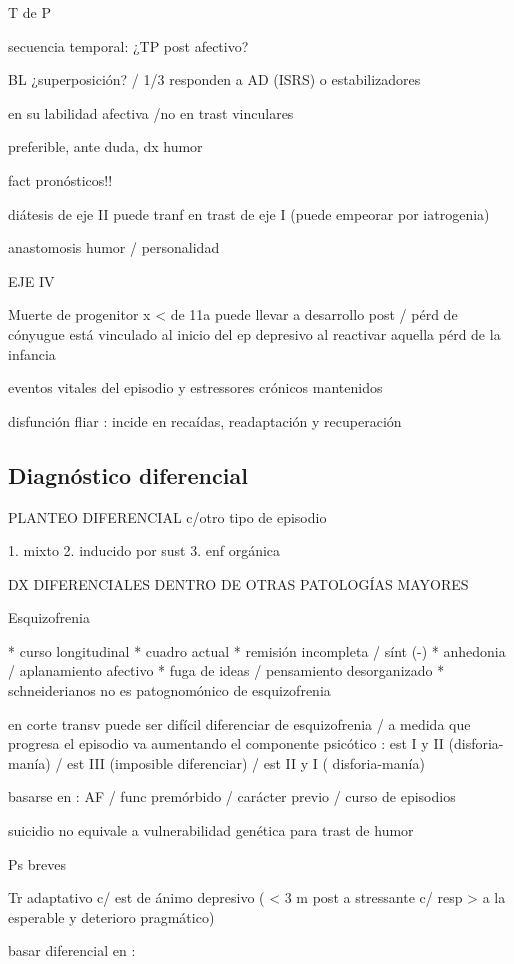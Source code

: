 \documentclass{scrbook}
\begin{document}
T de P

secuencia temporal: ¿TP post afectivo?

BL ¿superposición? / 1/3 responden a AD (ISRS) o estabilizadores

en su labilidad afectiva /no en trast vinculares

preferible, ante duda, dx humor

fact pronósticos!!

diátesis de eje II puede tranf en trast de eje I (puede empeorar por iatrogenia)

anastomosis humor / personalidad

EJE IV

Muerte de progenitor x < de 11a puede llevar a desarrollo post / pérd de cónyugue está vinculado al inicio del ep depresivo al reactivar aquella pérd de la infancia

eventos vitales del episodio y estressores crónicos mantenidos

disfunción fliar : incide en recaídas, readaptación y recuperación


\subsection*{Diagnóstico diferencial}
PLANTEO DIFERENCIAL c/otro tipo de episodio

1. mixto
2. inducido por sust
3. enf orgánica

DX DIFERENCIALES DENTRO DE OTRAS PATOLOGÍAS MAYORES

Esquizofrenia

* curso longitudinal
* cuadro actual
* remisión incompleta / sínt (-)
* anhedonia / aplanamiento afectivo
* fuga de ideas / pensamiento desorganizado
* schneiderianos no es patognomónico de esquizofrenia

en corte transv puede ser difícil diferenciar de esquizofrenia / a medida que progresa el episodio va aumentando el componente psicótico : est I y II (disforia-manía) / est III (imposible diferenciar) / est II y I ( disforia-manía)

basarse en : AF / func premórbido / carácter previo / curso de episodios

suicidio no equivale a vulnerabilidad genética para trast de humor

Ps breves

Tr adaptativo c/ est de ánimo depresivo ( < 3 m post a stressante c/ resp > a la esperable y deterioro pragmático)

basar diferencial en :
\end{document}
